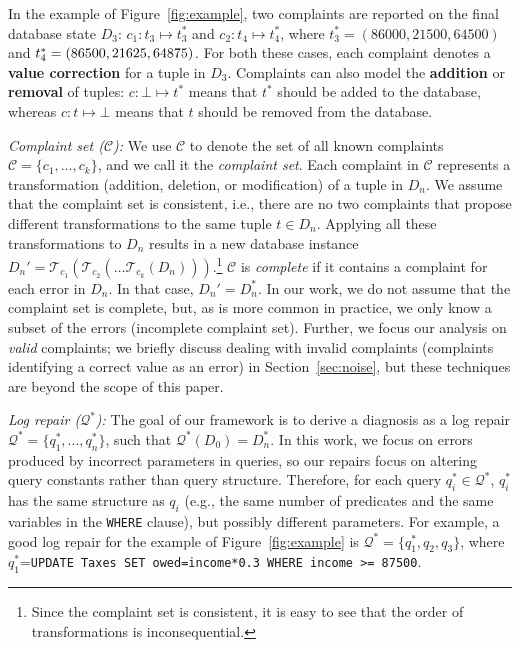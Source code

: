 In the example of Figure~\ref{fig:example}, two complaints are reported on the final database state $D_3$: 
$c_1: t_3\mapsto t_3^*$ and
$c_2: t_4\mapsto t_4^*$, 
where $t_3^*=(86000,21500,64500)$ and $t_4^*=(86500,21625,\linebreak 64875)$. 
For both these cases, each complaint denotes a \textbf{value correction} for a tuple in $D_3$.  Complaints can also model the \textbf{addition} or \textbf{removal} of tuples: $c: \bot\mapsto t^*$ means that $t^*$ should be added to the database, whereas $c: t\mapsto \bot$
means that $t$ should be removed from the database.


\smallskip
\noindent
\emph{Complaint set ($\mathcal{C}$):}
We use $\mathcal{C}$ to denote the set of all known complaints
$\mathcal{C}=\{c_1,\dots,c_k\}$, and we call it the \emph{complaint set}.
Each complaint in $\mathcal{C}$ represents a transformation (addition,
deletion, or modification) of a tuple in $D_n$. We assume that the
complaint set is consistent, i.e., there are no two complaints that
propose different transformations to the same tuple $t\in D_n$.
Applying all these transformations to $D_n$ results in a new database
instance
$D_n'=\mathcal{T}_{c_1}(\mathcal{T}_{c_2}(\dots\mathcal{T}_{c_k}(D_n)))$.\footnote{Since
the complaint set is consistent, it is easy to see that the order of
transformations is inconsequential.} $\mathcal{C}$ is \emph{complete}
if it contains a complaint for each error in $D_n$. In that case,
$D_n'=D_n^*$. In our work, we do not assume that the complaint set is
complete, but, as is more common in practice, we only know a subset of
the errors (incomplete complaint set). Further, we focus our analysis
on \emph{valid} complaints; we briefly discuss dealing with invalid
complaints (complaints identifying a correct value as an error) in
Section~\ref{sec:noise}, but these techniques are beyond the scope of this paper.

\smallskip
\noindent
\emph{Log repair ($\mathcal{Q}^*$):}
The goal of our framework is to derive a diagnosis as a log repair
$\mathcal{Q}^*=\{q_1^*,\dots, q_n^*\}$, such that
$\mathcal{Q}^*(D_0)=D_n^*$. In this work, we focus on errors produced
by incorrect parameters in queries, so our repairs focus on altering
query constants rather than query structure. Therefore, for each query
$q_i^*\in\mathcal{Q}^*$, $q_i^*$ has the same structure as $q_i$
(e.g., the same number of predicates and the same variables in the \texttt{WHERE} clause), 
but possibly different parameters. For example, a good log repair for the
example of Figure~\ref{fig:example} is
$\mathcal{Q}^*=\{q_1^*,q_2,q_3\}$, where $q_1^*$=\texttt{UPDATE Taxes
SET owed=income*0.3 WHERE income >= 87500}.


